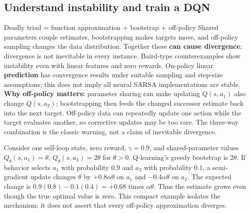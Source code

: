 \documentclass[10pt,a4paper]{article}
\begin{document}
\subsection{Understand instability and train a DQN}
\begin{card}{Deadly triad = function approximation + bootstrap + off-policy}
Shared parameters couple estimates, bootstrapping makes targets move, and off-policy sampling changes the data distribution. Together these \textbf{can cause divergence}; divergence is not inevitable in every instance.
Baird-type counterexamples show instability even with linear features and zero rewards. On-policy linear \textbf{prediction} has convergence results under suitable sampling and step-size assumptions; this does not imply all neural SARSA implementations are stable.
\textbf{Why off-policy matters:} parameter sharing can make updating $Q(s,a_1)$ also change $Q(s,a_2)$; bootstrapping then feeds the changed successor estimate back into the next target. Off-policy data can repeatedly update one action while the target evaluates another, so corrective updates may be too rare. The three-way combination is the classic warning, not a claim of inevitable divergence.
\end{card}

\begin{idea}
Consider one self-loop state, zero reward, $\gamma=0.9$, and shared-parameter values $Q_\theta(s,a_1)=\theta$, $Q_\theta(s,a_2)=2\theta$ for $\theta>0$. Q-learning's greedy bootstrap is $2\theta$. If behavior selects $a_1$ with probability $0.9$ and $a_2$ with probability $0.1$, a semi-gradient update changes $\theta$ by $+0.8\alpha\theta$ on $a_1$ and $-0.4\alpha\theta$ on $a_2$. The expected change is $0.9(0.8)-0.1(0.4)=+0.68$ times $\alpha\theta$. Thus the estimate grows even though the true optimal value is zero. This compact example isolates the mechanism; it does not assert that every off-policy approximation diverges.
\end{idea}
\end{document}

